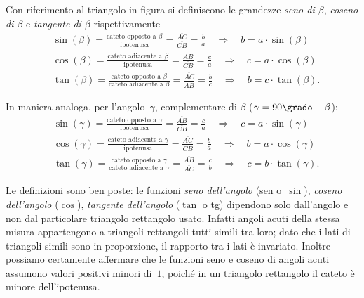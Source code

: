 \begin{definizione}
Con riferimento al triangolo in figura si definiscono le grandezze \emph{seno di $\beta$}, \emph{coseno di $\beta$} e \emph{tangente di $\beta$} rispettivamente
\begin{align*}
&\sin(\beta)=\frac{\text{cateto opposto a }\beta}{\text{ipotenusa}}=\frac{\overline{AC}}{\overline{CB}}=\frac{b}{a}\quad\Rightarrow\quad b=a\cdot \sin(\beta)\\
&\cos(\beta)=\frac{\text{cateto adiacente a }\beta}{\text{ipotenusa}}=\frac{\overline{AB}}{\overline{CB}}=\frac{c}{a}\quad\Rightarrow\quad c=a\cdot \cos(\beta)\\
&\tan(\beta)=\frac{\text{cateto opposto a }\beta}{\text{cateto adiacente a }\beta}=\frac{\overline{AC}}{\overline{AB}}=\frac{b}{c}\quad\Rightarrow\quad b=c\cdot \tan(\beta).
\end{align*}
\end{definizione}

\begin{definizione}
In maniera analoga, per l'angolo~$\gamma$, complementare di $\beta$ ($\gamma =90\grado - \beta$):
\begin{align*}
&\sin(\gamma)=\frac{\text{cateto opposto a }\gamma}{\text{ipotenusa}}=\frac{\overline{AB}}{\overline{CB}}=\frac{c}{a}\quad\Rightarrow\quad c=a\cdot \sin(\gamma)\\
&\cos(\gamma)=\frac{\text{cateto adiacente a }\gamma}{\text{ipotenusa}}=\frac{\overline{AC}}{\overline{CB}}=\frac{b}{a}\quad\Rightarrow\quad b=a\cdot \cos(\gamma)\\
&\tan(\gamma)=\frac{\text{cateto opposto a }\gamma}{\text{cateto adiacente a }\gamma}=\frac{\overline{AB}}{\overline{AC}}=\frac{c}{b}\quad\Rightarrow\quad c=b\cdot \tan(\gamma).
\end{align*}
\end{definizione}

Le definizioni sono ben poste: le funzioni \emph{seno dell'angolo} (sen o~$\sin$), \emph{coseno dell'angolo} ($\cos$), \emph{tangente dell'angolo}
($\tan$ o tg) dipendono solo dall'angolo e non dal particolare triangolo rettangolo usato. Infatti angoli acuti della stessa misura appartengono a
triangoli rettangoli tutti simili tra loro; dato che i lati di triangoli simili sono in proporzione, il rapporto tra i lati è invariato.
Inoltre possiamo certamente affermare che le funzioni seno e coseno di angoli acuti assumono valori positivi minori di~$1$,
poiché in un triangolo rettangolo il cateto è minore dell'ipotenusa.

